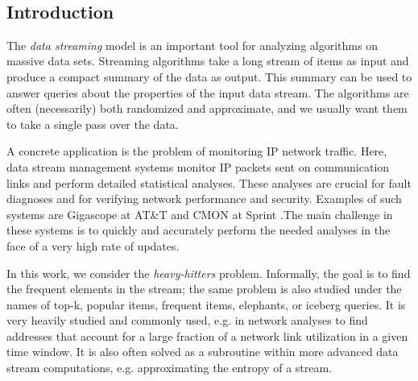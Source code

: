 \documentclass{article}
\newcommand{\ignore}[1]{}
\begin{document}
	\hfill \\
	
	\begin{multicols}{2}
	\section{Introduction}
The {\em data streaming} model is an important tool for analyzing algorithms on massive data sets. Streaming algorithms
take a long stream of items as input and produce a compact summary of the data as output. This summary can be used to answer queries about the properties of the input data stream. The algorithms are often (necessarily) both randomized and approximate, and we usually want them to take a single pass over the data.

A concrete application is the problem of monitoring IP network traffic. Here, data stream management systems monitor IP packets sent on communication links and perform detailed statistical analyses. These analyses are crucial for fault diagnoses and for verifying network performance and security. Examples of such systems are Gigascope at AT\&T \cite{Giga} and CMON at Sprint \cite{CMON}.The main challenge in these systems is to quickly and accurately perform the needed analyses in the face of a very high rate of updates.

\ignore{
Today's world is the world of big data, with data generated, for instance, by queries to Google or in the form of IP addresses on the router. Sometimes, we may have devices to store the data and sometimes not. Due to the large data sizes, traditional algorithms fail to process the data. It may be difficult or almost impossible to store huge amount of data at one place and we want algorithm to run in linear or sub-linear time. Many a times, we may come across a situation in which we can not store the data physically in any device, e.g Internet traffic. 
}

In this work, we consider the {\em heavy-hitters} problem. Informally, the goal is to find the frequent elements in the stream; the same problem is also studied under the names of top-k, popular items, frequent items, elephants, or iceberg queries. It is very heavily studied and commonly used, e.g. in network analyses to find addresses that account for a large fraction of a network link utilization in a given time window. It is also often solved as a subroutine within more advanced data stream computations, e.g. approximating the entropy of a stream.


\end{multicols}
\end{document}
